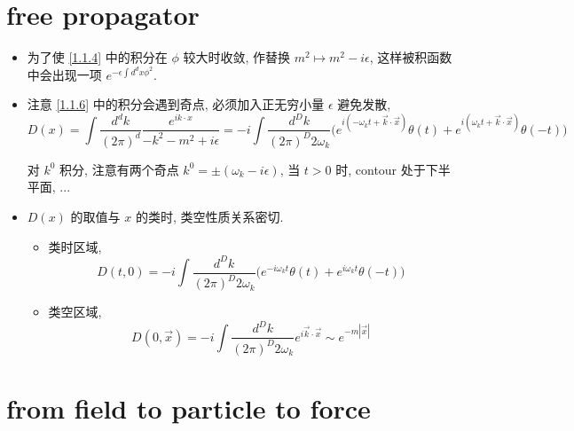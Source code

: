 \section{free propagator}
\begin{itemize}
	\item 为了使 \eqref{1.1.4} 中的积分在 $\phi$ 较大时收敛, 作替换 $m^2 \mapsto m^2 - i \epsilon$, 这样被积函数中会出现一项 $e^{- \epsilon \int d^d x \phi^2}$.
	
	\item 注意 \eqref{1.1.6} 中的积分会遇到奇点, 必须加入正无穷小量 $\epsilon$ 避免发散,
	\begin{equation} \label{1.2.1}
		D(x) = \int \frac{d^d k}{(2 \pi)^d} \frac{e^{i k \cdot x}}{- k^2 - m^2 + i \epsilon} = - i \int \frac{d^D k}{(2 \pi)^D 2 \omega_k} \Big( e^{i (- \omega_k t + \vec{k} \cdot \vec{x})} \theta(t) + e^{i (\omega_k t + \vec{k} \cdot \vec{x})} \theta(- t) \Big)
	\end{equation}
	
	\begin{tcolorbox}[title=calculation:]
		对 $k^0$ 积分, 注意有两个奇点 $k^0 = \pm (\omega_k - i \epsilon)$, 当 $t > 0$ 时, contour 处于下半平面, ...
	\end{tcolorbox}
	
	\item $D(x)$ 的取值与 $x$ 的类时, 类空性质关系密切.
	\begin{itemize}
		\item 类时区域,
		\begin{equation}
			D(t, 0) = - i \int \frac{d^D k}{(2 \pi)^D 2 \omega_k} \Big( e^{- i \omega_k t} \theta(t) + e^{i \omega_k t} \theta(- t) \Big)
		\end{equation}
		
		\item 类空区域,
		\begin{equation}
			D(0, \vec{x}) = - i \int \frac{d^D k}{(2 \pi)^D 2 \omega_k} e^{i \vec{k} \cdot \vec{x}} \sim e^{- m |\vec{x}|}
		\end{equation}
	\end{itemize}
\end{itemize}

\section{from field to particle to force}
